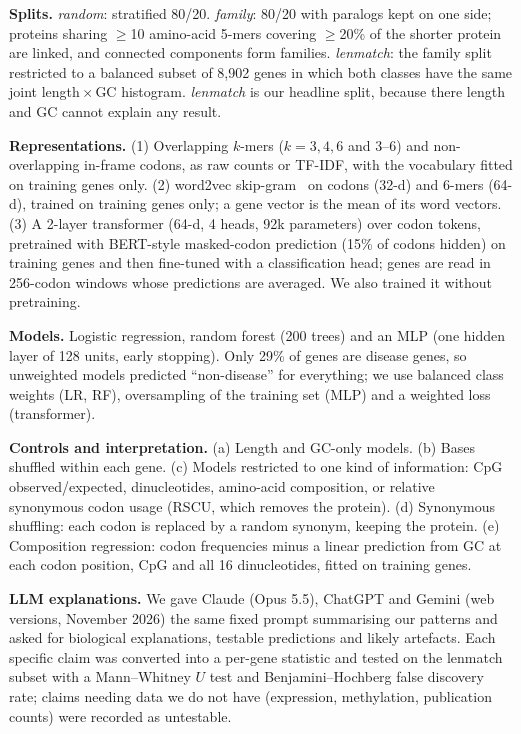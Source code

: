 \documentclass[11pt,a4paper,twocolumn]{article}
\begin{document}
\textbf{Splits.} \emph{random}: stratified 80/20. \emph{family}: 80/20 with
paralogs kept on one side; proteins sharing $\ge$10 amino-acid 5-mers covering
$\ge$20\% of the shorter protein are linked, and connected components form
families. \emph{lenmatch}: the family split restricted to a balanced subset of
8,902 genes in which both classes have the same joint length\,$\times$\,GC
histogram. \emph{lenmatch} is our headline split, because there length and
GC cannot explain any result.

\textbf{Representations.}
(1) Overlapping $k$-mers ($k{=}3,4,6$ and $3$--$6$) and non-overlapping in-frame
codons, as raw counts or TF-IDF, with the vocabulary fitted on training genes only.
(2) word2vec skip-gram~\cite{mikolov2013} on codons (32-d) and 6-mers (64-d),
trained on training genes only; a gene vector is the mean of its word vectors.
(3) A 2-layer transformer (64-d, 4 heads, 92k parameters) over codon tokens,
pretrained with BERT-style masked-codon prediction (15\% of codons hidden) on
training genes and then fine-tuned with a classification head; genes are read
in 256-codon windows whose predictions are averaged. We also trained it without
pretraining.

\textbf{Models.} Logistic regression, random forest (200 trees) and an MLP
(one hidden layer of 128 units, early stopping). Only 29\% of genes are disease
genes, so unweighted models predicted ``non-disease'' for everything; we use
balanced class weights (LR, RF), oversampling of the training set (MLP) and a
weighted loss (transformer).

\textbf{Controls and interpretation.} (a) Length and GC-only models.
(b) Bases shuffled within each gene. (c) Models restricted to one kind of
information: CpG observed/expected, dinucleotides, amino-acid composition, or
relative synonymous codon usage (RSCU, which removes the protein). (d) Synonymous
shuffling: each codon is replaced by a random synonym, keeping the protein.
(e) Composition regression: codon frequencies minus a linear prediction from GC at
each codon position, CpG and all 16 dinucleotides, fitted on training genes.

\textbf{LLM explanations.} We gave Claude (Opus 5.5), ChatGPT and Gemini
(web versions, November 2026) the same fixed prompt summarising our patterns
and asked for biological explanations, testable predictions and likely artefacts.
Each specific claim was converted into a per-gene statistic and tested on the
lenmatch subset with a Mann--Whitney $U$ test and Benjamini--Hochberg false
discovery rate; claims needing data we do not have (expression, methylation,
publication counts) were recorded as untestable.
\end{document}
